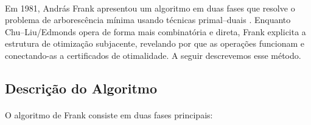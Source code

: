 \documentclass[12pt,a4paper]{article}
\def\emph#1{#1}%
\begin{document}
\paragraph{}
Em 1981, András Frank apresentou um algoritmo em duas fases que resolve o problema de arborescência mínima usando técnicas primal–duais \cite{frank1981}. Enquanto Chu–Liu/Edmonds opera de forma mais combinatória e direta, Frank explicita a estrutura de otimização subjacente, revelando \emph{por que} as operações funcionam e conectando-as a certificados de otimalidade. A seguir descrevemos esse método.

\subsection{Descrição do Algoritmo}
\paragraph{}
O algoritmo de Frank consiste em duas fases principais:
\end{document}
